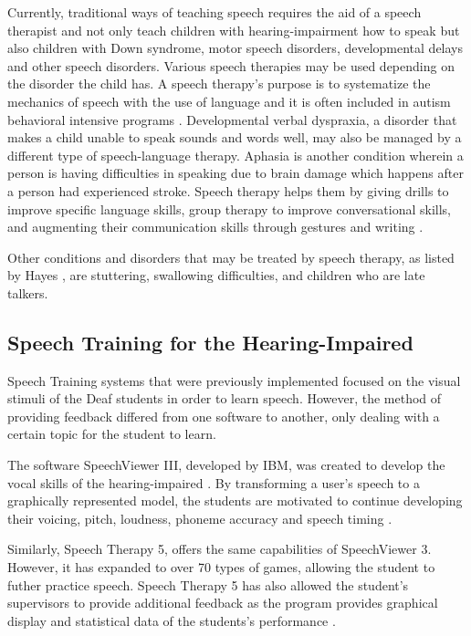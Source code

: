Currently, traditional ways of teaching speech requires the aid of a speech therapist and not only teach children with hearing-impairment how to speak but also children with Down syndrome, motor speech disorders, developmental delays and other speech disorders. Various speech therapies may be used depending on the disorder the child has. A speech therapy's purpose is to systematize the mechanics of speech with the use of language and it is often included in autism behavioral intensive programs \cite{autispks:2015:slmi}. Developmental verbal dyspraxia, a disorder that makes a child unable to speak sounds and words well, may also be managed by a different type of speech-language therapy. Aphasia is another condition wherein a person is having difficulties in speaking due to brain damage \cite{damasio:1992:aphasia} which happens after a person had experienced stroke. Speech therapy helps them by giving drills to improve specific language skills, group therapy to improve conversational skills, and augmenting their communication skills through gestures and writing \cite{hayes:2013:tost}.

Other conditions and disorders that may be treated by speech therapy, as listed by Hayes \citeyear{hayes:2013:tost}, are stuttering, swallowing difficulties, and children who are late talkers.

\subsection{Speech Training for the Hearing-Impaired}
Speech Training systems that were previously implemented focused on the visual stimuli of the Deaf students in order to learn speech. However, the method of providing feedback differed from one software to another, only dealing with a certain topic for the student to learn.

The software SpeechViewer III, developed by IBM, was created to develop the vocal skills of the hearing-impaired \cite{speechville:2014:slp}. By transforming a user's speech to a graphically represented model, the students are motivated to continue developing their voicing, pitch, loudness, phoneme accuracy and speech timing \cite{kennedy:1998:spv}.

Similarly, Speech Therapy 5, offers the same capabilities of SpeechViewer 3. However, it has expanded to over 70 types of games, allowing the student to futher practice speech. Speech Therapy 5 has also allowed the student's supervisors to provide additional feedback as the program provides graphical display and statistical data of the students's performance \cite{drspeech:1998:st5}.


